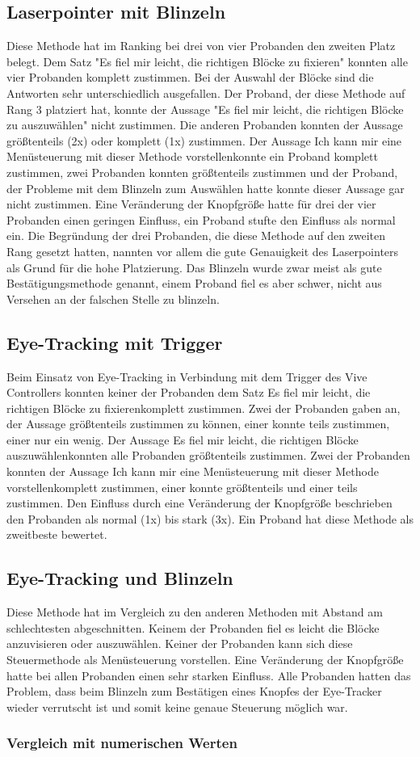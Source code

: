 \subsection{Laserpointer mit Blinzeln}
Diese Methode hat im Ranking bei drei von vier Probanden den zweiten Platz belegt. Dem Satz "Es fiel mir leicht, die richtigen Blöcke zu fixieren" konnten alle vier Probanden komplett zustimmen. Bei der Auswahl der Blöcke sind die Antworten sehr unterschiedlich ausgefallen. Der Proband, der diese Methode auf Rang 3 platziert hat, konnte der Aussage "Es fiel mir leicht, die richtigen Blöcke zu auszuwählen"  nicht zustimmen. Die anderen Probanden konnten der Aussage größtenteils (2x) oder komplett (1x) zustimmen. Der Aussage \grqq Ich kann mir eine Menüsteuerung mit dieser Methode vorstellen\grqq konnte ein Proband komplett zustimmen, zwei Probanden konnten größtenteils zustimmen und der Proband, der Probleme mit dem Blinzeln zum Auswählen hatte konnte dieser Aussage gar nicht zustimmen. Eine Veränderung der Knopfgröße hatte für drei der vier Probanden einen geringen Einfluss, ein Proband stufte den Einfluss als normal ein. Die Begründung der drei Probanden, die diese Methode auf den zweiten Rang gesetzt hatten, nannten vor allem die gute Genauigkeit des Laserpointers als Grund für die hohe Platzierung. Das Blinzeln wurde zwar meist als gute Bestätigungsmethode genannt, einem Proband fiel es aber schwer, nicht aus Versehen an der falschen Stelle zu blinzeln. 
\subsection{Eye-Tracking mit Trigger}
Beim Einsatz von Eye-Tracking in Verbindung mit dem Trigger des Vive Controllers konnten keiner der Probanden dem Satz \grqq Es fiel mir leicht, die richtigen Blöcke zu fixieren\grqq komplett zustimmen. Zwei der Probanden gaben an, der Aussage größtenteils zustimmen zu können, einer konnte teils zustimmen, einer nur ein wenig. Der Aussage \grqq Es fiel mir leicht, die richtigen Blöcke auszuwählen\grqq konnten alle Probanden größtenteils zustimmen. Zwei der Probanden konnten der Aussage \grqq Ich kann mir eine Menüsteuerung mit dieser Methode vorstellen\grqq komplett zustimmen, einer konnte größtenteils und einer teils zustimmen. Den Einfluss durch eine Veränderung der Knopfgröße beschrieben den Probanden als normal (1x) bis stark (3x). Ein Proband hat diese Methode als zweitbeste bewertet.
\subsection{Eye-Tracking und Blinzeln}
Diese Methode hat im Vergleich zu den anderen Methoden mit Abstand am schlechtesten abgeschnitten. Keinem der Probanden fiel es leicht die Blöcke anzuvisieren oder auszuwählen. Keiner der Probanden kann sich diese Steuermethode als Menüsteuerung vorstellen. Eine Veränderung der Knopfgröße hatte bei allen Probanden einen sehr starken Einfluss. Alle Probanden hatten das Problem, dass beim Blinzeln zum Bestätigen eines Knopfes der Eye-Tracker wieder verrutscht ist und somit keine genaue Steuerung möglich war.
\subsubsection{Vergleich mit numerischen Werten}
